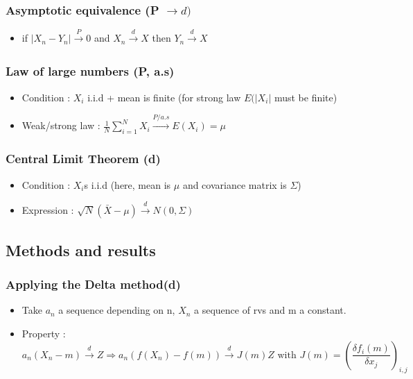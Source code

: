\documentclass{article}
\begin{document}
\subsubsection{Asymptotic equivalence (P $\xrightarrow{}d)$}
\begin{itemize}
    \item if $|X_n-Y_n|\xrightarrow[]{P}0$ and $X_n\xrightarrow[]{d}X$ then $Y_n\xrightarrow[]{d}X$
\end{itemize}
\subsubsection{Law of large numbers (P, a.s)}
\begin{itemize}
    \item Condition : $X_i$ i.i.d + mean is finite (for strong law $E(|X_i|$ must be finite)
    \item Weak/strong law : $\frac{1}{N}\sum_{i=1}^{N}X_i\xrightarrow[]{P/a.s}E(X_i) =\mu$
\end{itemize}

\subsubsection{Central Limit Theorem (d)}
\begin{itemize}
    \item Condition : $X_i$s i.i.d (here, mean is $\mu$ and covariance matrix is $\Sigma$)
    \item Expression : $\sqrt{N}(\bar{X}-\mu) \xrightarrow[]{d}N(0,\Sigma)$
\end{itemize}

\subsection{Methods and results}
\subsubsection{Applying the Delta method(d)}
\begin{itemize}
    \item Take $a_n$ a sequence depending on n, $X_n$ a sequence of rvs and m a constant. 
    \item Property :
\begin{equation}
    a_n(X_n-m) \xrightarrow[]{d}Z \Longrightarrow a_n(f(X_n)-f(m))\xrightarrow[]{d}J(m)Z \text{ with } J(m)=(\frac{\delta f_i(m)}{\delta x_j})_{i,j}
\end{equation}
\end{itemize}
\end{document}
